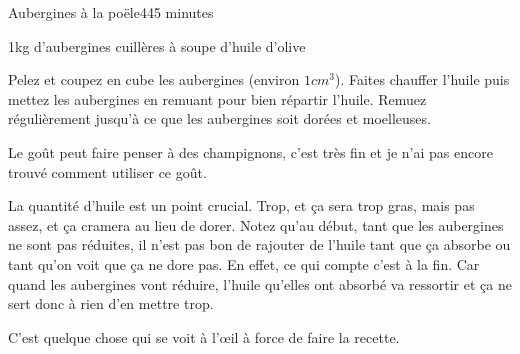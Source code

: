 \begin{recette}{Aubergines à la poële}{4}{45 minutes}{}
\begin{ingredients}
\ingredient 1kg d'aubergines
 cuillères à soupe d'huile d'olive
\end{ingredients}

\begin{preparation}
\etape Pelez et coupez en cube les aubergines (environ $1\unit{cm}^3$).
\etape Faites chauffer l'huile puis mettez les aubergines en remuant pour bien répartir l'huile. 
\etape Remuez régulièrement jusqu'à ce que les aubergines soit dorées et moelleuses.
\end{preparation}

Le goût peut faire penser à des champignons, c'est très fin et je n'ai pas encore trouvé comment utiliser ce goût.

\begin{remarque}
La quantité d'huile est un point crucial. Trop, et ça sera trop gras, mais pas assez, et ça cramera au lieu de dorer. Notez qu'au début, tant que les aubergines ne sont pas réduites, il n'est pas bon de rajouter de l'huile tant que ça absorbe ou tant qu'on voit que ça ne dore pas. En effet, ce qui compte c'est à la fin. Car quand les aubergines vont réduire, l'huile qu'elles ont absorbé va ressortir et ça ne sert donc à rien d'en mettre trop. 

C'est quelque chose qui se voit à l'œil à force de faire la recette.
\end{remarque}

\end{recette}

